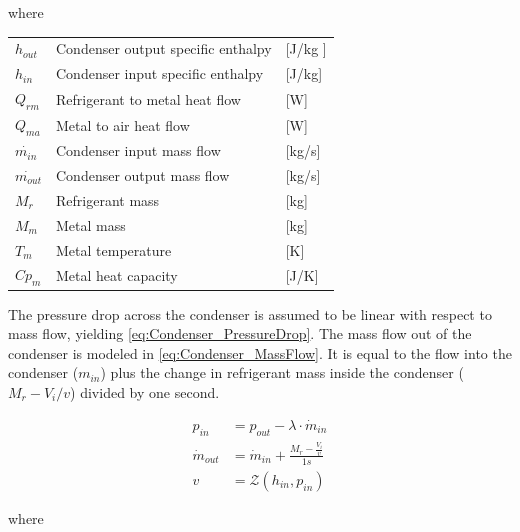 where

\begin{center}
	\begin{tabular}{l p{8cm} l}
		$h_{out}$       & Condenser output specific enthalpy & [\si{J}/\si{kg} ] \\
		$h_{in}$        & Condenser input specific enthalpy  & [\si{J}/\si{kg}]  \\
		$Q_{rm}$        & Refrigerant to metal heat flow     & [\si{W}]          \\
		$Q_{ma}$        & Metal to air heat flow             & [\si{W}]          \\
		$\dot{m_{in}}$  & Condenser input mass flow          & [\si{kg}/\si{s}]  \\
		$\dot{m_{out}}$ & Condenser output mass flow         & [\si{kg}/\si{s}]  \\
		$M_r$           & Refrigerant mass                   & [\si{kg}]         \\
		$M_m$           & Metal mass                         & [\si{kg}]         \\
		$T_m$           & Metal temperature                  & [\si{K}]          \\
		$Cp_m$          & Metal heat capacity                & [\si{J}/\si{K}]
	\end{tabular}
\end{center}

The pressure drop across the condenser is assumed to be linear with respect to mass flow, yielding \cref{eq:Condenser_PressureDrop}.
The mass flow out of the condenser is modeled in \cref{eq:Condenser_MassFlow}. It is equal to the flow into the condenser ($m_{in}$) plus the change in refrigerant mass inside the condenser ($M_r - V_i/v$) divided by one second.


\begin{align}
	p_{in} 	& =  p_{out} - \lambda \cdot \dot{m}_{in}  				\label{eq:Condenser_PressureDrop}\\
	\dot{m}_{out}		& = \dot{m}_{in} + \frac{M_r - \frac{V_i}{v}}{1s}		\label{eq:Condenser_MassFlow} \\
	v & = \mathcal{Z}(h_{in}, p_{in})
\end{align}

where

